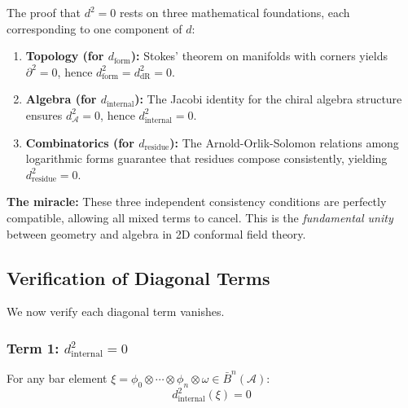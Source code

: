 \begin{strategy}\label{strategy:three-pillars}
The proof that $d^2 = 0$ rests on three mathematical foundations, each corresponding
to one component of $d$:

\begin{enumerate}
\item \textbf{Topology (for $d_{\text{form}}$):} Stokes' theorem on manifolds with corners
yields $\partial^2 = 0$, hence $d_{\text{form}}^2 = d_{\text{dR}}^2 = 0$.

\item \textbf{Algebra (for $d_{\text{internal}}$):} The Jacobi identity for the chiral
algebra structure ensures $d_{\mathcal{A}}^2 = 0$, hence $d_{\text{internal}}^2 = 0$.

\item \textbf{Combinatorics (for $d_{\text{residue}}$):} The Arnold-Orlik-Solomon
relations among logarithmic forms guarantee that residues compose consistently,
yielding $d_{\text{residue}}^2 = 0$.
\end{enumerate}

\textbf{The miracle:} These three independent consistency conditions are perfectly
compatible, allowing all mixed terms to cancel. This is the \emph{fundamental unity}
between geometry and algebra in 2D conformal field theory.
\end{strategy}

\subsection{Verification of Diagonal Terms}

We now verify each diagonal term vanishes.

\subsubsection{Term 1: $d_{\text{internal}}^2 = 0$}

\begin{proposition}\label{prop:d-int-squared}
For any bar element $\xi = \phi_0 \otimes \cdots \otimes \phi_n \otimes \omega \in \bar{B}^n(\mathcal{A})$:
$$d_{\text{internal}}^2(\xi) = 0$$
\end{proposition}

